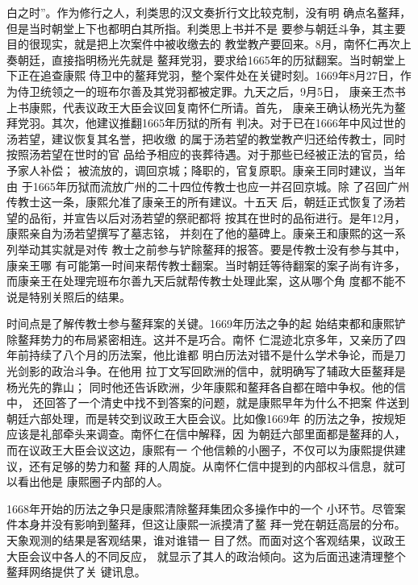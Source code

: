 白之时”。作为修行之人，利类思的汉文奏折行文比较克制，没有明%
确点名鳌拜，但是当时朝堂上下也都明白其所指。利类思上书并不是%
要参与朝廷斗争，其主要目的很现实，就是把上次案件中被收缴去的%
教堂教产要回来。8月，南怀仁再次上奏朝廷，直接指明杨光先就是%
鳌拜党羽，要求给1665年的历狱翻案。当时朝堂上下正在追查康熙%
侍卫中的鳌拜党羽，整个案件处在关键时刻。1669年8月27日，作%
为侍卫统领之一的班布尔善及其党羽都被定罪。九天之后，9月5日，%
康亲王杰书上书康熙，代表议政王大臣会议回复南怀仁所请。首先，%
康亲王确认杨光先为鳌拜党羽。其次，他建议推翻1665年历狱的所有%
判决。对于已在1666年中风过世的汤若望，建议恢复其名誉，把收缴%
的属于汤若望的教堂教产归还给传教士，同时按照汤若望在世时的官%
品给予相应的丧葬待遇。对于那些已经被正法的官员，给予家人补偿；%
被流放的，调回京城；降职的，官复原职。康亲王同时建议，当年由%
于1665年历狱而流放广州的二十四位传教士也应一并召回京城。除%
了召回广州传教士这一条，康熙允准了康亲王的所有建议。十五天%
后，朝廷正式恢复了汤若望的品衔，并宣告以后对汤若望的祭祀都将%
按其在世时的品衔进行。是年12月，康熙亲自为汤若望撰写了墓志铭，%
并刻在了他的墓碑上。康亲王和康熙的这一系列举动其实就是对传%
教士之前参与铲除鳌拜的报答。要是传教士没有参与其中，康亲王哪%
有可能第一时间来帮传教士翻案。当时朝廷等待翻案的案子尚有许多，%
而康亲王在处理完班布尔善九天后就帮传教士处理此案，这从哪个角%
度都不能不说是特别关照后的结果。%
\par
时间点是了解传教士参与鳌拜案的关键。1669年历法之争的起%
始结束都和康熙铲除鳌拜势力的布局紧密相连。这并不是巧合。南怀%
仁混迹北京多年，又亲历了四年前持续了八个月的历法案，他比谁都%
明白历法对错不是什么学术争论，而是刀光剑影的政治斗争。在他用%
拉丁文写回欧洲的信中，就明确写了辅政大臣鳌拜是杨光先的靠山；%
同时他还告诉欧洲，少年康熙和鳌拜各自都在暗中争权。他的信中，%
还回答了一个清史中找不到答案的问题，就是康熙早年为什么不把案%
件送到朝廷六部处理，而是转交到议政王大臣会议。比如像1669年%
的历法之争，按规矩应该是礼部牵头来调查。南怀仁在信中解释，因%
为朝廷六部里面都是鳌拜的人，而在议政王大臣会议这边，康熙有一%
个他信赖的小圈子，不仅可以为康熙提供建议，还有足够的势力和鳌%
拜的人周旋。从南怀仁信中提到的内部权斗信息，就可以看出他是%
康熙圈子内部的人。%
\par
1668年开始的历法之争只是康熙清除鳌拜集团众多操作中的一个%
小环节。尽管案件本身并没有影响到鳌拜，但这让康熙一派摸清了鳌%
拜一党在朝廷高层的分布。天象观测的结果是客观结果，谁对谁错一%
目了然。而面对这个客观结果，议政王大臣会议中各人的不同反应，%
就显示了其人的政治倾向。这为后面迅速清理整个鳌拜网络提供了关%
键讯息。%
\par
%
